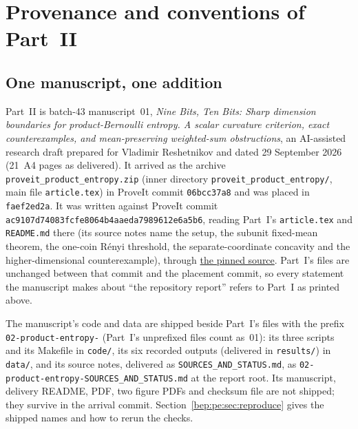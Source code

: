 \documentclass[11pt]{article}
\numberwithin{equation}{section}
\theoremstyle{definition}
\theoremstyle{remark}
\begin{document}
\section{Provenance and conventions of Part~II}\label{bep:pe:sec:intro}

\subsection{One manuscript, one addition}\label{bep:pe:sec:source}
Part~II is batch-43 manuscript~01, \emph{Nine Bits, Ten Bits: Sharp
dimension boundaries for product-Bernoulli entropy. A scalar curvature
criterion, exact counterexamples, and mean-preserving weighted-sum
obstructions}, an AI-assisted research draft prepared for Vladimir
Reshetnikov and dated 29 September 2026 (21~A4 pages as delivered). It
arrived as the archive \nolinkurl{proveit_product_entropy.zip} (inner
directory \nolinkurl{proveit_product_entropy/}, main file
\nolinkurl{article.tex}) in ProveIt commit \texttt{06bcc37a8} and was
placed in \texttt{faef2ed2a}. It was written against ProveIt commit
\texttt{ac9107d74083fcfe8064b4aaeda7989612e6a5b6}, reading Part~I's
\nolinkurl{article.tex} and \nolinkurl{README.md} there (its source notes
name the setup, the subunit fixed-mean theorem, the one-coin R\'enyi
threshold, the separate-coordinate concavity and the higher-dimensional
counterexample), through
\href{https://github.com/VladimirReshetnikov/ProveIt/blob/ac9107d74083fcfe8064b4aaeda7989612e6a5b6/SetTheory/Cardinals/docs/reports/log-concavity-and-unimodality/bernoulli-entropy-quasiconcavity/article.tex}{the
pinned source}. Part~I's files are unchanged between that commit and the
placement commit, so every statement the manuscript makes about ``the
repository report'' refers to Part~I as printed above.

\begin{sloppypar}
The manuscript's code and data are shipped beside Part~I's files with the
prefix \texttt{02-product-entropy-} (Part~I's unprefixed files count
as~01): its three scripts and its Makefile in \nolinkurl{code/}, its six
recorded outputs (delivered in \nolinkurl{results/}) in
\nolinkurl{data/}, and its source notes, delivered as
\nolinkurl{SOURCES_AND_STATUS.md}, as
\nolinkurl{02-product-entropy-SOURCES_AND_STATUS.md} at the report root.
Its manuscript, delivery README, PDF, two figure PDFs and checksum file
are not shipped; they survive in the arrival commit.
Section~\ref{bep:pe:sec:reproduce} gives the shipped names and how to
rerun the checks.
\end{sloppypar}
\end{document}
